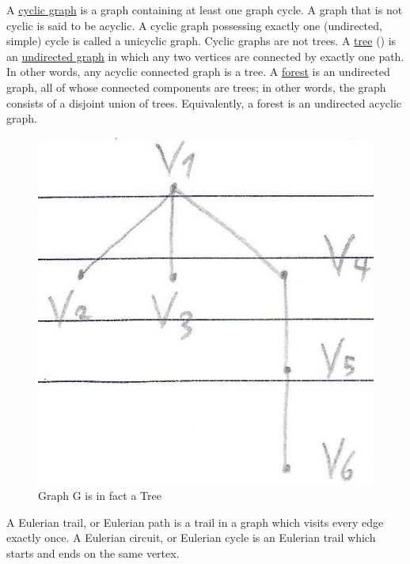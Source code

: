 \documentclass[12pt]{article}
\begin{document}
\begin{flushleft}
	\textbullet \quad A \uline{cyclic graph} is a graph containing at least one graph cycle. A graph that is not cyclic is said to be acyclic. A cyclic graph possessing exactly one (undirected, simple) cycle is called a unicyclic graph. Cyclic graphs are not trees. \linebreak 
	\textbullet \quad A \uline{tree} () is an \uline{undirected graph} in which any two vertices are connected by exactly one path. In other words, any acyclic connected graph is a tree. \linebreak 
	\textbullet \quad A \uline{forest} is an undirected graph, all of whose connected components are trees; in other words, the graph consists of a disjoint union of trees. Equivalently, a forest is an undirected acyclic graph. \linebreak 
		
	\begin{figure}[ht]
	\centering
	\includegraphics[scale=1]{graphGtree}
	\caption{Graph G is in fact a Tree}
	\label{fig:graphGtree}
	\end{figure}
	
	\textbullet \quad A Eulerian trail, or Eulerian path is a trail in a graph which visits every edge exactly once. \linebreak 
	\textbullet \quad A Eulerian circuit, or Eulerian cycle is an Eulerian trail which starts and ends on the same vertex. \linebreak 
		

\end{flushleft}
\end{document}
